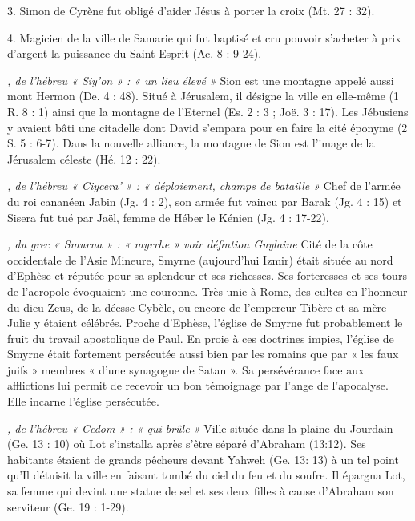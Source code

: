 \begin{multicols}{2}
3. Simon de Cyrène fut obligé d'aider Jésus à porter la croix (Mt. 27 : 32).

4. Magicien de la ville de Samarie qui fut baptisé et cru pouvoir s'acheter à prix d'argent la puissance du Saint-Esprit (Ac. 8 : 9-24).

\textit{, de l'hébreu « Siy'on » : « un lieu élevé »}\newline
Sion est une montagne appelé aussi mont Hermon (De. 4 : 48). Situé à Jérusalem, il désigne la ville en elle-même (1 R. 8 : 1) ainsi que la montagne de l'Eternel (Es. 2 : 3 ; Joë. 3 : 17). Les Jébusiens y avaient bâti une citadelle dont David s'empara pour en faire la cité éponyme (2 S. 5 : 6-7). Dans la nouvelle alliance, la montagne de Sion est l'image de la Jérusalem céleste (Hé. 12 : 22).

\textit{, de l'hébreu « Ciycera' » : « déploiement, champs de bataille »}\newline
Chef de l'armée du roi cananéen Jabin (Jg. 4 : 2), son armée fut vaincu par Barak (Jg. 4 : 15) et Sisera fut tué par Jaël, femme de Héber le Kénien (Jg. 4 : 17-22).

\textit{, du grec « Smurna » : « myrrhe » voir défintion Guylaine}\newline
Cité de la côte occidentale de l’Asie Mineure, Smyrne (aujourd’hui Izmir) était située au nord d’Ephèse et réputée pour sa splendeur et ses richesses. Ses forteresses et ses tours de l’acropole évoquaient une couronne. Très unie à Rome, des cultes en l’honneur du dieu Zeus, de la déesse Cybèle, ou encore de l’empereur Tibère et sa mère Julie y étaient célébrés.
Proche d’Ephèse, l’église de Smyrne fut probablement le fruit du travail apostolique de Paul. En proie à ces doctrines impies, l’église de Smyrne était fortement persécutée aussi bien par les romains que par « les faux juifs » membres « d’une synagogue de Satan ». Sa persévérance face aux afflictions lui permit de recevoir un bon témoignage par l’ange de l’apocalyse. Elle incarne l’église persécutée.

\textit{, de l'hébreu « Cedom » : « qui brûle »}\newline
Ville située dans la plaine du Jourdain (Ge. 13 : 10) où Lot s'installa après s'être séparé d'Abraham (13:12). Ses habitants étaient de grands pêcheurs devant Yahweh (Ge. 13: 13) à un tel point qu'Il détuisit la ville en faisant tombé du ciel du feu et du soufre. Il épargna Lot, sa femme qui devint une statue de sel et ses deux filles à cause d'Abraham son serviteur (Ge. 19 : 1-29).


\end{multicols}
